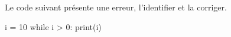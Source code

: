 \documentclass[11pt, a4paper]{report}
\begin{document}
    \begin{minipage}{0.48\linewidth}
        \begin{exercice_cours}[Débogage]
         Le code suivant présente une erreur, l'identifier et la corriger.
    \end{exercice_cours}

    \end{minipage}\hfill
    \begin{minipage}{0.48\linewidth}
    \begin{CodePythontexAlt}[TaillePolice=\large, Largeur=1\linewidth,Centre,Lignes=true,PremLigne=1]{}
i = 10
while i > 0:
    print(i)
    \end{CodePythontexAlt}
    \end{minipage}

    
\end{document}
